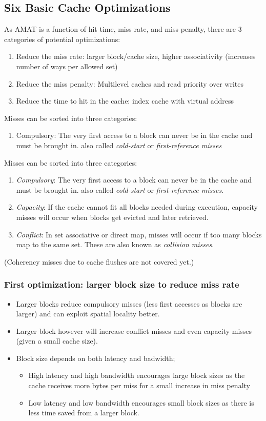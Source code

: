 \subsection{Six Basic Cache Optimizations}
As AMAT is a function of hit time, miss rate, and miss penalty, there are 3 categories of potential optimizations:
\begin{enumerate}
  \item Reduce the miss rate: larger block/cache size, higher associativity (increases number of ways per allowed set)
  \item Reduce the miss penalty: Multilevel caches and read priority over writes
  \item Reduce the time to hit in the cache: index cache with virtual address
\end{enumerate}
Misses can be sorted into three categories:
\begin{enumerate}
  \item Compulsory: The very first access to a block can never be in the cache and must be brought in. also called \textit{cold-start} or \textit{first-reference misses}
\end{enumerate}
  Misses can be sorted into three categories:
\begin{enumerate}
  \item \textit{Compulsory}: The very first access to a block can never be in the cache and must be brought in. also called \textit{cold-start} or \textit{first-reference misses}.
  \item \textit{Capacity}: If the cache cannot fit all blocks needed during execution, capacity misses will occur when blocks get evicted and later retrieved.
  \item \textit{Conflict}: In set associative or direct map, misses will occur if too many blocks map to the same set. These are also known as \textit{collision misses}. 
\end{enumerate}
(Coherency misses due to cache flushes are not covered yet.)
\newline
\subsubsection{First optimization: larger block size to reduce miss rate}
\begin{itemize}
  \item Larger blocks reduce compulsory misses (less first accesses as blocks are larger) and can exploit spatial locality better.
  \item Larger block however will increase conflict misses and even capacity misses (given a small cache size).
  \item Block size depends on both latency and badwidth;
  \begin{itemize}
    \item High latency and high bandwidth encourages large block sizes as the cache receives more bytes per miss for a small increase in miss penalty
    \item Low latency and low bandwidth encourages small block sizes as there is less time saved from a larger block.
  \end{itemize}
\end{itemize}
